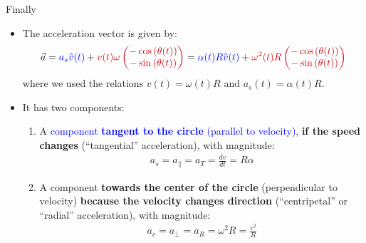 \documentclass[aspectratio=169,
hyperref={colorlinks,urlcolor=blue}
]{beamer}
\begin{document}
\begin{frame}{Finally}
\begin{itemize}
\item The acceleration vector is given by:
\begin{align*}
\vec a = \textcolor{blue}{a_s \hat v (t)}+ \textcolor{myred}{v(t)\omega \begin{pmatrix}
-\cos\left(\theta(t)\right)\\
-\sin\left(\theta(t)\right)\end{pmatrix}}=\textcolor{blue}{\alpha(t) R\hat v (t)}+ \textcolor{myred}{\omega^2(t) R \begin{pmatrix}
-\cos\left(\theta(t)\right)\\
-\sin\left(\theta(t)\right)\end{pmatrix}}
\end{align*}
where we used the relations $v(t)=\omega(t) R$ and $a_s(t)=\alpha(t) R$.
\item It has two components:
\begin{enumerate}
\item A \textcolor{blue}{component \textbf{tangent to the circle} (parallel to velocity)}, \textbf{if the speed changes} (``tangential'' acceleration), with magnitude:
\begin{align*}
a_s=a_\parallel=a_T=\frac{dv}{dt}=R\alpha
\end{align*}
\item A \textcolor{myred}{component \textbf{towards the center of the circle} (perpendicular to velocity)} \textbf{because the velocity changes direction} (``centripetal'' or ``radial'' acceleration), with magnitude:
\begin{align*}
a_c=a_\perp=a_R=\omega^2 R=\frac{v^2}{R}
\end{align*}
\end{enumerate}
\end{itemize}
\end{frame}














\end{document}

